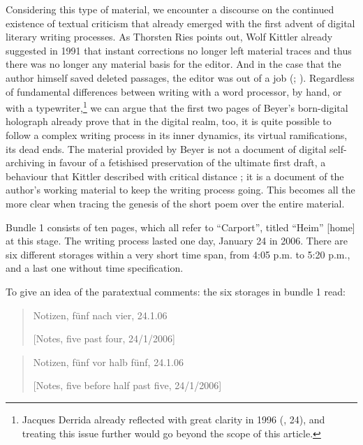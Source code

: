 \begin{paper}
Considering this type of material, we encounter a discourse on the
continued existence of textual criticism that already emerged with the
first advent of digital literary writing processes. As Thorsten Ries points out,
Wolf Kittler already suggested in 1991 that instant corrections no longer left material traces and thus there was no longer
any material basis for the editor. And in the case that the author
himself saved deleted passages, the editor was out of a job 
(\cite[235]{kittler_literatur_1991};  \cite[129]{ries_philology_2017}). Regardless of fundamental differences
between writing with a word processor, by hand, or with a typewriter,\footnote{Jacques Derrida already reflected with great clarity in 1996 (\cite{derrida_paper_2005}, 24), and treating this issue further would go beyond the scope of
this article.} we can argue that the first two pages of Beyer's born-digital
holograph already prove that in the digital realm, too, it is quite
possible to follow a complex writing process in its inner dynamics, its
virtual ramifications, its dead ends. The material provided by Beyer is
not a document of digital self-archiving in favour of a fetishised
preservation of the ultimate first draft, a behaviour that Kittler
described with critical distance \citep[130]{ries_philology_2017}; it is a document of
the author's working material to keep the writing process going. This
becomes all the more clear when tracing the genesis of the short poem
over the entire material.

Bundle 1 consists of ten pages, which all refer to ``Carport'', titled
``Heim'' [home] at this stage. The writing process lasted one day,
January 24 in 2006. There are six different storages within a very short
time span, from 4:05 p.m. to 5:20 p.m., and a last one without time
specification.

To give an idea of the paratextual comments: the six
storages in bundle 1 read:

\begin{quote}
Notizen, fünf nach vier, 24.1.06

\vspace{1em}

[Notes, five past four, 24/1/2006]
\end{quote}

\begin{quote}
Notizen, fünf vor halb fünf, 24.1.06

\vspace{1em}

[Notes, five before half past five, 24/1/2006]
\end{quote}


\end{paper}
